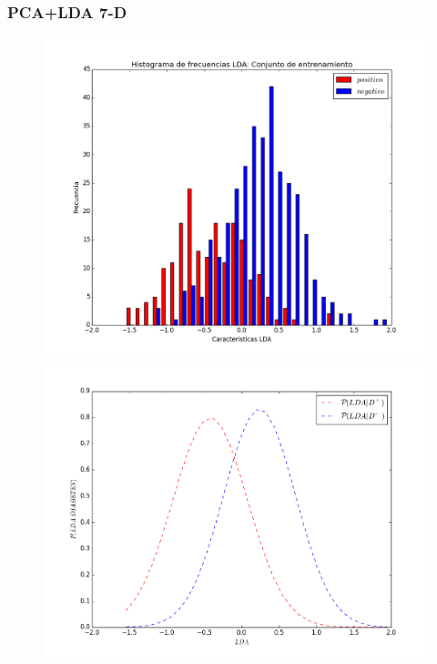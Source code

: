 \documentclass[letter, titlepage, 10pt]{article}
\begin{document}
\subsubsection{PCA+LDA 7-D}
  \begin{figure}[H]
  \centering
    \begin{minipage}{.5\textwidth}
        \centering
        \includegraphics[width=1\linewidth]{images/Histograma_D7}
    \end{minipage}%
    \begin{minipage}{.5\textwidth}
        \centering
        \includegraphics[width=1\linewidth]{images/PDF_D7}

\end{minipage}
\end{figure}
\end{document}
